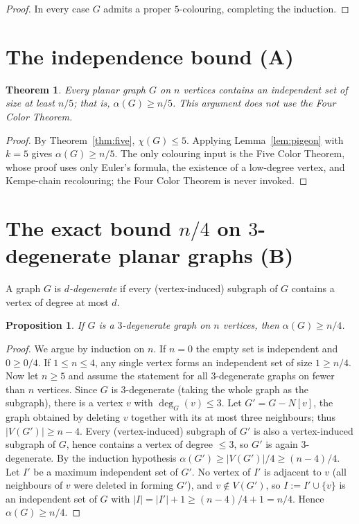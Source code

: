 \documentclass{amsart}
\newtheorem{theorem}{Theorem}
\newtheorem{proposition}{Proposition}
\theoremstyle{remark}
\begin{document}
\begin{proof}
In every case $G$ admits a proper $5$-colouring, completing the induction.
\end{proof}

\section{The independence bound (A)}

\begin{theorem}\label{thm:main}
Every planar graph $G$ on $n$ vertices contains an independent set of size at
least $n/5$; that is, $\alpha(G)\ge n/5$. This argument does not use the Four
Color Theorem.
\end{theorem}

\begin{proof}
By Theorem~\ref{thm:five}, $\chi(G)\le5$. Applying Lemma~\ref{lem:pigeon} with
$k=5$ gives $\alpha(G)\ge n/5$. The only colouring input is the Five Color
Theorem, whose proof uses only Euler's formula, the existence of a low-degree
vertex, and Kempe-chain recolouring; the Four Color Theorem is never invoked.
\end{proof}

\section{The exact bound \texorpdfstring{$n/4$}{n/4} on \texorpdfstring{$3$}{3}-degenerate
planar graphs (B)}\label{sec:3deg}

A graph $G$ is \emph{$d$-degenerate} if every (vertex-induced) subgraph of $G$
contains a vertex of degree at most $d$.

\begin{proposition}\label{prop:3deg}
If $G$ is a $3$-degenerate graph on $n$ vertices, then $\alpha(G)\ge n/4$.
\end{proposition}

\begin{proof}
We argue by induction on $n$. If $n=0$ the empty set is independent and
$0\ge 0/4$. If $1\le n\le4$, any single vertex forms an independent set of size
$1\ge n/4$. Now let $n\ge5$ and assume the statement for all $3$-degenerate
graphs on fewer than $n$ vertices. Since $G$ is $3$-degenerate (taking the whole
graph as the subgraph), there is a vertex $v$ with $\deg_G(v)\le3$. Let
$G'=G-N[v]$, the graph obtained by deleting $v$ together with its at most three
neighbours; thus $|V(G')|\ge n-4$. Every (vertex-induced) subgraph of $G'$ is
also a vertex-induced subgraph of $G$, hence contains a vertex of degree $\le3$,
so $G'$ is again $3$-degenerate. By the induction hypothesis
$\alpha(G')\ge |V(G')|/4\ge (n-4)/4$. Let $I'$ be a maximum independent set of
$G'$. No vertex of $I'$ is adjacent to $v$ (all neighbours of $v$ were deleted in
forming $G'$), and $v\notin V(G')$, so $I:=I'\cup\{v\}$ is an independent set of
$G$ with $|I|=|I'|+1\ge (n-4)/4+1 = n/4$. Hence $\alpha(G)\ge n/4$.
\end{proof}
\end{document}

